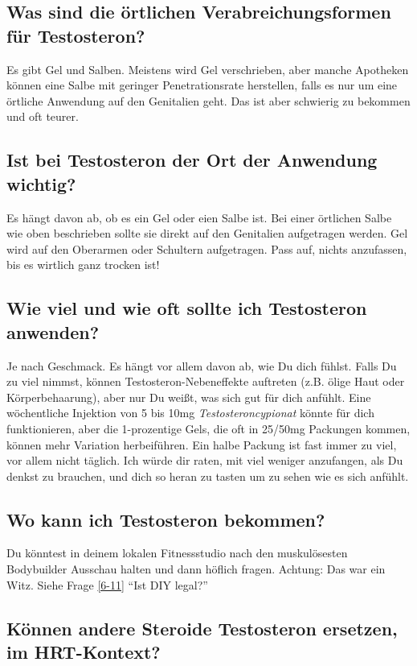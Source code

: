 \documentclass{article}
\begin{document}
{{{\subsection{Was sind die örtlichen Verabreichungsformen für Testosteron?}

Es gibt Gel und Salben. Meistens wird Gel verschrieben, aber manche Apotheken können eine Salbe mit geringer Penetrationsrate herstellen, falls es nur um eine örtliche Anwendung auf den Genitalien geht. Das ist aber schwierig zu bekommen und oft teurer.

\subsection{Ist bei Testosteron der Ort der Anwendung wichtig?}

Es hängt davon ab, ob es ein Gel oder eien Salbe ist. Bei einer örtlichen Salbe wie oben beschrieben sollte sie direkt auf den Genitalien aufgetragen werden. Gel wird auf den Oberarmen oder Schultern aufgetragen. Pass auf, nichts anzufassen, bis es wirtlich ganz trocken ist!

\subsection{Wie viel und wie oft sollte ich Testosteron anwenden?}

Je nach Geschmack. Es hängt vor allem davon ab, wie Du dich fühlst. Falls Du zu viel nimmst, können Testosteron-Nebeneffekte auftreten (z.B. ölige Haut oder Körperbehaarung), aber nur Du weißt, was sich gut für dich anfühlt. Eine wöchentliche Injektion von 5 bis 10mg \textit{Testosteroncypionat} könnte für dich funktionieren, aber die 1-prozentige Gels, die oft in 25/50mg Packungen kommen, können mehr Variation herbeiführen. Ein halbe Packung ist fast immer zu viel, vor allem nicht täglich. Ich würde dir raten, mit viel weniger anzufangen, als Du denkst zu brauchen, und dich so heran zu tasten um zu sehen wie es sich anfühlt.

\subsection{Wo kann ich Testosteron bekommen?}

Du könntest in deinem lokalen Fitnessstudio nach den muskulösesten Bodybuilder Ausschau halten und dann höflich fragen. Achtung: Das war ein Witz. Siehe Frage \ref{6-11} “Ist DIY legal?”

\subsection{Können andere Steroide Testosteron ersetzen, im HRT-Kontext?}

}}}
\end{document}
